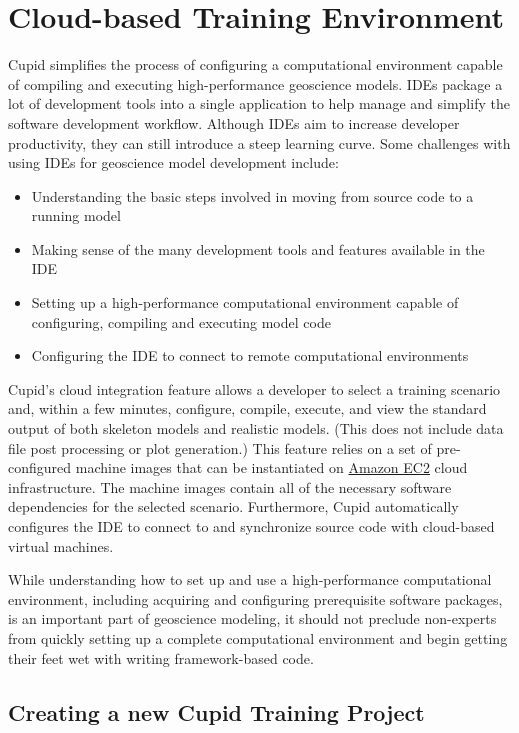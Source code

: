 \documentclass[oneside,11pt]{memoir}
\begin{document}
\chapter{Cloud-based Training Environment}

Cupid simplifies the process of configuring a computational environment capable of compiling and executing high-performance geoscience models. IDEs package a lot of development tools into a single application to help manage and simplify the software development workflow. Although IDEs aim to increase developer productivity, they can still introduce a steep learning curve. Some challenges with using IDEs for geoscience model development include:

\begin{itemize}
\item Understanding the basic steps involved in moving from source code to a running model
\item Making sense of the many development tools and features available in the IDE
\item Setting up a high-performance computational environment capable of configuring, compiling and executing model code
\item Configuring the IDE to connect to remote computational environments
\end{itemize}

Cupid's cloud integration feature allows a developer to select a training scenario and, within a few minutes, configure, compile, execute, and view the standard output of both skeleton models and realistic models. (This does not include data file post processing or plot generation.) This feature relies on a set of pre-configured machine images that can be instantiated on \href{http://aws.amazon.com/ec2/}{Amazon EC2} cloud infrastructure. The machine images contain all of the necessary software dependencies for the selected scenario. Furthermore, Cupid automatically configures the IDE to connect to and synchronize source code with cloud-based virtual machines.

While understanding how to set up and use a high-performance computational environment, including acquiring and configuring prerequisite software packages, is an important part of geoscience modeling, it should not preclude non-experts from quickly setting up a complete computational environment and begin getting their feet wet with writing framework-based code.

\section{Creating a new Cupid Training Project}
\end{document}

